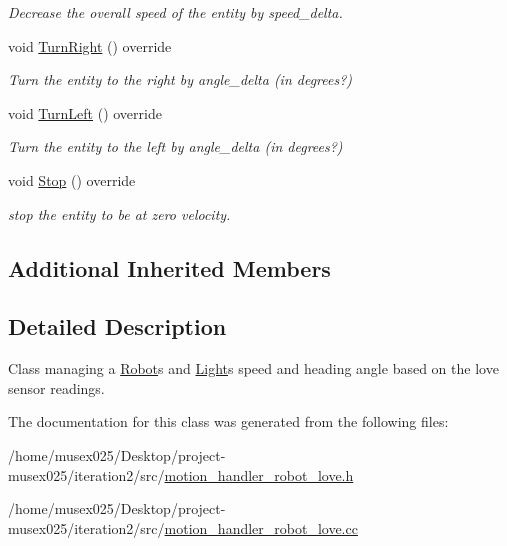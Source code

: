 \begin{DoxyCompactItemize}
\begin{DoxyCompactList}\small\item\em Decrease the overall speed of the entity by speed\+\_\+delta. \end{DoxyCompactList}\item 
void \hyperlink{classMotionHandlerRobotLove_aeff4a675940af2d42c6a8fd2a4519d66}{Turn\+Right} () override\hypertarget{classMotionHandlerRobotLove_aeff4a675940af2d42c6a8fd2a4519d66}{}\label{classMotionHandlerRobotLove_aeff4a675940af2d42c6a8fd2a4519d66}

\begin{DoxyCompactList}\small\item\em Turn the entity to the right by angle\+\_\+delta (in degrees?) \end{DoxyCompactList}\item 
void \hyperlink{classMotionHandlerRobotLove_a26b07483889261be22d5df90d2bdf81c}{Turn\+Left} () override\hypertarget{classMotionHandlerRobotLove_a26b07483889261be22d5df90d2bdf81c}{}\label{classMotionHandlerRobotLove_a26b07483889261be22d5df90d2bdf81c}

\begin{DoxyCompactList}\small\item\em Turn the entity to the left by angle\+\_\+delta (in degrees?) \end{DoxyCompactList}\item 
void \hyperlink{classMotionHandlerRobotLove_aaff39b4c62e5c46743bc65af94e9a09a}{Stop} () override\hypertarget{classMotionHandlerRobotLove_aaff39b4c62e5c46743bc65af94e9a09a}{}\label{classMotionHandlerRobotLove_aaff39b4c62e5c46743bc65af94e9a09a}

\begin{DoxyCompactList}\small\item\em stop the entity to be at zero velocity. \end{DoxyCompactList}\end{DoxyCompactItemize}
\subsection*{Additional Inherited Members}


\subsection{Detailed Description}
Class managing a \hyperlink{classRobot}{Robot}\textquotesingle{}s and \hyperlink{classLight}{Light}\textquotesingle{}s speed and heading angle based on the love sensor readings. 

The documentation for this class was generated from the following files\+:\begin{DoxyCompactItemize}
\item 
/home/musex025/\+Desktop/project-\/musex025/iteration2/src/\hyperlink{motion__handler__robot__love_8h}{motion\+\_\+handler\+\_\+robot\+\_\+love.\+h}\item 
/home/musex025/\+Desktop/project-\/musex025/iteration2/src/\hyperlink{motion__handler__robot__love_8cc}{motion\+\_\+handler\+\_\+robot\+\_\+love.\+cc}\end{DoxyCompactItemize}
